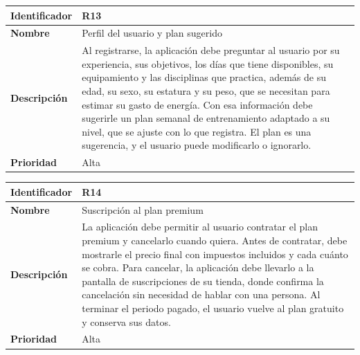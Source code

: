 \begin{table}[h!]
    \centering
    \renewcommand{\arraystretch}{1.3}
    \begin{tabular}{|p{3.5cm}|p{11.5cm}|}
        \hline
        \rowcolor[HTML]{EFEFEF} 
        \textbf{Identificador} & \textbf{R13} \\ \hline
        \textbf{Nombre} & Perfil del usuario y plan sugerido \\ \hline
        \textbf{Descripción} & Al registrarse, la aplicación debe preguntar al usuario por su experiencia, sus objetivos, los días que tiene disponibles, su equipamiento y las disciplinas que practica, además de su edad, su sexo, su estatura y su peso, que se necesitan para estimar su gasto de energía. Con esa información debe sugerirle un plan semanal de entrenamiento adaptado a su nivel, que se ajuste con lo que registra. El plan es una sugerencia, y el usuario puede modificarlo o ignorarlo. \\ \hline
        \textbf{Prioridad} & Alta \\ \hline
    \end{tabular}
\end{table}
\begin{table}[h!]
    \centering
    \renewcommand{\arraystretch}{1.3}
    \begin{tabular}{|p{3.5cm}|p{11.5cm}|}
        \hline
        \rowcolor[HTML]{EFEFEF}
        \textbf{Identificador} & \textbf{R14} \\ \hline
        \textbf{Nombre} & Suscripción al plan premium \\ \hline
        \textbf{Descripción} & La aplicación debe permitir al usuario contratar el plan premium y cancelarlo cuando quiera. Antes de contratar, debe mostrarle el precio final con impuestos incluidos y cada cuánto se cobra. Para cancelar, la aplicación debe llevarlo a la pantalla de suscripciones de su tienda, donde confirma la cancelación sin necesidad de hablar con una persona. Al terminar el periodo pagado, el usuario vuelve al plan gratuito y conserva sus datos. \\ \hline
        \textbf{Prioridad} & Alta \\ \hline
    \end{tabular}
\end{table}
\newpage
